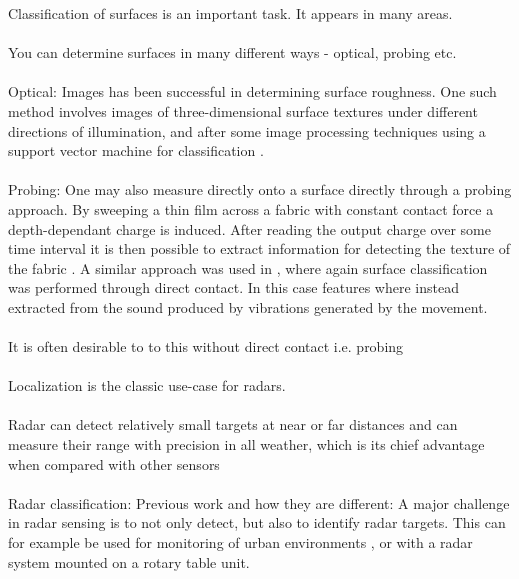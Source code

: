 Classification of surfaces is an important task. It appears in many areas.
\\ \\
You can determine surfaces in many different ways - optical, probing etc.
\\ \\
\noindent Optical: Images has been successful in determining surface roughness. One such method involves images of three-dimensional surface textures under different directions of illumination, and after some image processing techniques using a support vector machine for classification \citep{dong_duan_yang_2008}. 
\\ \\
\noindent Probing: One may also measure directly onto a surface directly through a probing approach. By sweeping a thin film across a fabric with constant contact force a depth-dependant charge is induced. After reading the output charge over some time interval it is then possible to extract information for detecting the texture of the fabric \citep{song_han_hu_li_2014}. A similar approach was used in \citep{strese_schuwerk_iepure_steinbach_2017}, where again surface classification was performed through direct contact. In this case features where instead extracted from the sound produced by vibrations generated by the movement. 
\\ \\
It is often desirable to to this without direct contact i.e. probing
\\ \\
Localization is the classic use-case for radars. 
\\ \\
 Radar  can detect relatively small targets at near or far distances and can measure their range with  precision  in  all weather,  which is  its chief  advantage when compared with other  sensors \citep{skolnik}
\\ \\
Radar classification: Previous work and how they are different: A major challenge in radar sensing is to not only detect, but also to identify radar targets. This can for example be used for monitoring of urban environments \citep{harter_kowalewski_sit_jalilvand_ziroff_zwick_2014}, or with a radar system mounted on a rotary table unit. 

